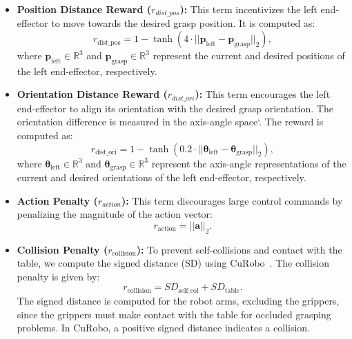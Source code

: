 \begin{itemize}
    \item \textbf{Position Distance Reward ($r_{dist\_pos}$):} 
    This term incentivizes the left end-effector to move towards the desired grasp position. It is computed as:
    \begin{equation}
        r_{\text{dist\_pos}} = 1 - \tanh(4 \cdot ||\mathbf{p}_{\text{left}} - \mathbf{p}_{\text{grasp}}||_{2}),
    \end{equation}
    where $\mathbf{p}_{\text{left}} \in \mathbb{R}^3$ and $\mathbf{p}_{\text{grasp}} \in \mathbb{R}^3$ represent the current and desired positions of the left end-effector, respectively.

    \item \textbf{Orientation Distance Reward ($r_{dist\_ori}$):} 
    This term encourages the left end-effector to align its orientation with the desired grasp orientation. The orientation difference is measured in the axis-angle space`. The reward is computed as:
    \begin{equation}
        r_{\text{dist\_ori}} = 1 - \tanh(0.2 \cdot ||\boldsymbol{\theta}_{\text{left}} - \boldsymbol{\theta}_{\text{grasp}}||_{2}),
    \end{equation}
    where $\boldsymbol{\theta}_{\text{left}} \in \mathbb{R}^3$ and $\boldsymbol{\theta}_{\text{grasp}} \in \mathbb{R}^3$ represent the axis-angle representations of the current and desired orientations of the left end-effector, respectively.

    \item \textbf{Action Penalty ($r_{action}$):} This term discourages large control commands by penalizing the magnitude of the action vector:
    \begin{equation}
        r_{\text{action}} = ||\mathbf{a}||_2.
    \end{equation}

    \item \textbf{Collision Penalty ($r_{\text{collision}}$):} To prevent self-collisions and contact with the table, we compute the signed distance (SD) using CuRobo~\cite{sundaralingam2023curobo}. The collision penalty is given by:
    \begin{equation}
        r_{\text{collision}} = SD_{\text{self\_col}} + SD_{\text{table}}.
    \end{equation}
    The signed distance is computed for the robot arms, excluding the grippers, since the grippers must make contact with the table for occluded grasping problems. In CuRobo, a positive signed distance indicates a collision.


\end{itemize}

